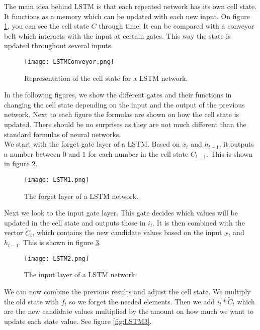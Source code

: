 The main idea behind LSTM is that each repeated network has its own cell state. It functions as a  memory which can be updated with each new input. On figure \ref{fig:LSTMConveyor}, you can see the cell state $C$ through time. It can be compared with a conveyor belt which interacts with the input at certain gates. This way the state is updated throughout several inputs.

\begin{figure}[H]
	\centering
	\texttt{[image: LSTMConveyor.png]}
	\caption{Representation of the cell state for a LSTM network.}
	\label{fig:LSTMConveyor}
\end{figure} 

In the following figures, we show the different gates and their functions in changing the cell state depending on the input and the output of the previous network. Next to each figure the formulas are shown on how the cell state is updated. There should be no surprises as they are not much different than the standard formulas of neural networks. \\

We start with the forget gate layer of a LSTM. Based on $x_t$ and $h_{t-1}$, it outputs a number between $0$ and $1$ for each number in the cell state $C_{t-1}$. This is shown in figure \ref{fig:LSTM1}.

\begin{figure}[H]
	\centering
	\texttt{[image: LSTM1.png]}
	\caption{The forget layer of a LSTM network.}
	\label{fig:LSTM1}
\end{figure} 

Next we look to the input gate layer. This gate decides which values will be updated in the cell state and outputs those in $i_t$. It is then combined with the vector $\widetilde{C}_t$, which contains the new candidate values based on the input $x_t$ and $h_{t-1}$. This is shown in figure \ref{fig:LSTM2}.

\begin{figure}[H]
	\centering
	\texttt{[image: LSTM2.png]}
	\caption{The input layer of a LSTM network.}
	\label{fig:LSTM2}
\end{figure} 

We can now combine the previous results and adjust the cell state. We multiply the old state with $f_t$ so we forget the needed elements. Then we add $i_t*\widetilde{C}_t$ which are the new candidate values multiplied by the amount on how much we want to update each state value. See figure \ref{fig:LSTM3}.

